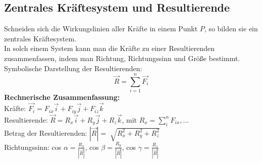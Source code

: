 \documentclass[a4paper,parskip=half*,DIV=7,fontsize=11pt]{scrartcl}
\begin{document}
	\subsection{Zentrales Kräftesystem und Resultierende}
	Schneiden sich die Wirkungslinien aller Kräfte in einem Punkt $P$, so bilden sie ein zentrales Kräftesystem.\\
	In solch einem System kann man die Kräfte zu einer Resultierenden zusammenfassen, indem man Richtung, Richtungssinn und Größe bestimmt.\\
	Symbolische Darstellung der Resultierenden: $$\overrightarrow{R}=\sum_{i=1}^n \overrightarrow{F_i}$$
	\textbf{Rechnerische Zusammenfassung:}\\
	Kräfte:  $\overrightarrow{F_i}=F_{ix}\overrightarrow{i}+F_{iy}\overrightarrow{j}+F_{iz}\overrightarrow{k}$\\
	Resultierende: $\overrightarrow{R}=R_x\overrightarrow{i}+R_y\overrightarrow{j}+R_z\overrightarrow{k}$, mit $R_x=\sum_i^n F_{ix},...$\\
	Betrag der Resultierenden: $|\overrightarrow{R}|=\sqrt[]{R_x^2+R_y^2+R_z^2}$\\
	Richtungssinn: cos $\alpha=\frac{R_x}{|\overrightarrow{R}|}$, cos $\beta=\frac{R_y}{|\overrightarrow{R}|}$, cos $\gamma=\frac{R_z}{|\overrightarrow{R}|}$
	
\end{document}

